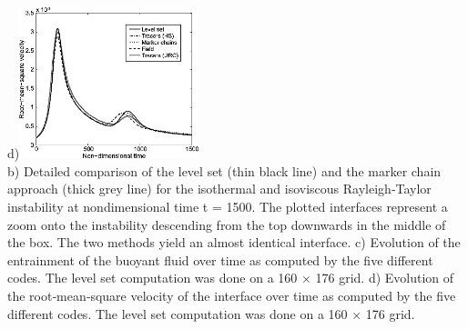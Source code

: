 \begin{itemize}
\begin{center}
d)\includegraphics[width=5.2cm]{images/benchmark_vaks97/sunh10_d}\\
{\captionfont 
b) Detailed comparison of the level set (thin black line) and the marker chain 
approach (thick grey line) for the isothermal and isoviscous Rayleigh‐Taylor 
instability at nondimensional time t = 1500. The plotted interfaces represent a 
zoom onto the instability descending from the top downwards in the middle of the box. 
The two methods yield an almost identical interface. 
c) Evolution of the entrainment of the buoyant fluid over time as computed by 
the five different codes. The level set computation was done on a 160 × 176 grid.
d) Evolution of the root‐mean‐square velocity of the interface over time 
as computed by the five different codes. The level set computation was done on a 160 × 176 grid.}
\end{center}


\end{itemize}
